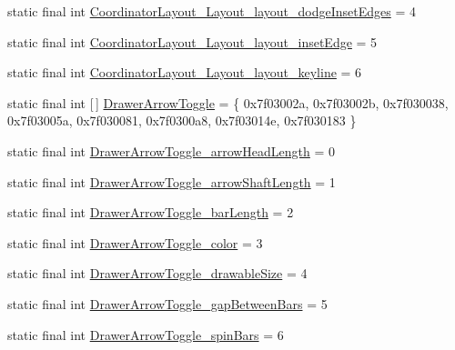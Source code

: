 \begin{DoxyCompactItemize}
\item 
static final int \mbox{\hyperlink{classcom_1_1synnapps_1_1carouselview_1_1_r_1_1styleable_a86667ea7f3a266ac82cff2214c54f10d}{Coordinator\+Layout\+\_\+\+Layout\+\_\+layout\+\_\+dodge\+Inset\+Edges}} = 4
\item 
static final int \mbox{\hyperlink{classcom_1_1synnapps_1_1carouselview_1_1_r_1_1styleable_a7962ec18452b1f70763bb93a8d052237}{Coordinator\+Layout\+\_\+\+Layout\+\_\+layout\+\_\+inset\+Edge}} = 5
\item 
static final int \mbox{\hyperlink{classcom_1_1synnapps_1_1carouselview_1_1_r_1_1styleable_a90104d1d63b6fb32290807aa2ff4c441}{Coordinator\+Layout\+\_\+\+Layout\+\_\+layout\+\_\+keyline}} = 6
\item 
static final int \mbox{[}$\,$\mbox{]} \mbox{\hyperlink{classcom_1_1synnapps_1_1carouselview_1_1_r_1_1styleable_a3213350ba13a7d227ba70e2e51f3574f}{Drawer\+Arrow\+Toggle}} = \{ 0x7f03002a, 0x7f03002b, 0x7f030038, 0x7f03005a, 0x7f030081, 0x7f0300a8, 0x7f03014e, 0x7f030183 \}
\item 
static final int \mbox{\hyperlink{classcom_1_1synnapps_1_1carouselview_1_1_r_1_1styleable_a8d0e3621611c8d2158c74c7fd7e0e49b}{Drawer\+Arrow\+Toggle\+\_\+arrow\+Head\+Length}} = 0
\item 
static final int \mbox{\hyperlink{classcom_1_1synnapps_1_1carouselview_1_1_r_1_1styleable_ab281c633a94d1f3a41f315a8ee4930d0}{Drawer\+Arrow\+Toggle\+\_\+arrow\+Shaft\+Length}} = 1
\item 
static final int \mbox{\hyperlink{classcom_1_1synnapps_1_1carouselview_1_1_r_1_1styleable_ab338cc55c6e08a08c468009b1ad1261a}{Drawer\+Arrow\+Toggle\+\_\+bar\+Length}} = 2
\item 
static final int \mbox{\hyperlink{classcom_1_1synnapps_1_1carouselview_1_1_r_1_1styleable_a23f985415e29c98b4a69fa3f08375c0b}{Drawer\+Arrow\+Toggle\+\_\+color}} = 3
\item 
static final int \mbox{\hyperlink{classcom_1_1synnapps_1_1carouselview_1_1_r_1_1styleable_a3df928b316c525a1c6045b3aa11175df}{Drawer\+Arrow\+Toggle\+\_\+drawable\+Size}} = 4
\item 
static final int \mbox{\hyperlink{classcom_1_1synnapps_1_1carouselview_1_1_r_1_1styleable_a16de2af2c6077a425a22df0ef63b821b}{Drawer\+Arrow\+Toggle\+\_\+gap\+Between\+Bars}} = 5
\item 
static final int \mbox{\hyperlink{classcom_1_1synnapps_1_1carouselview_1_1_r_1_1styleable_a441603486e544c5b45691376c4b0df10}{Drawer\+Arrow\+Toggle\+\_\+spin\+Bars}} = 6
\item 

\end{DoxyCompactItemize}
